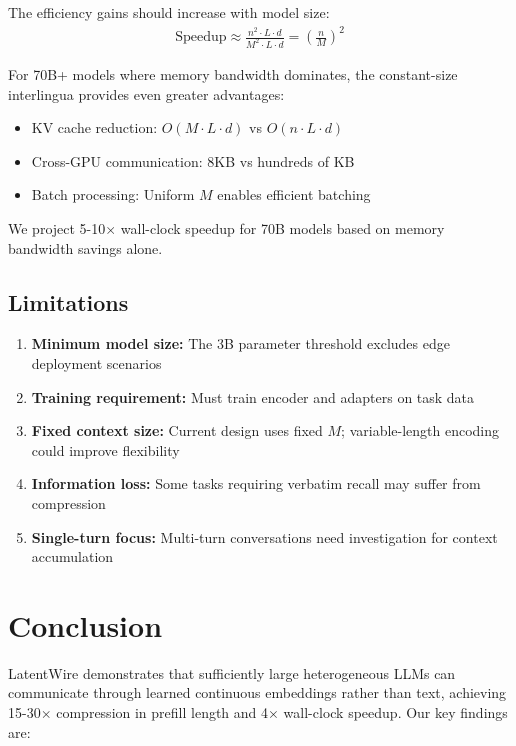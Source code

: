 \documentclass{article}
\begin{document}
The efficiency gains should increase with model size:
\begin{align}
\text{Speedup} \approx \frac{n^2 \cdot L \cdot d}{M^2 \cdot L \cdot d} = \left(\frac{n}{M}\right)^2
\end{align}

For 70B+ models where memory bandwidth dominates, the constant-size interlingua provides even greater advantages:
\begin{itemize}
\item KV cache reduction: $O(M \cdot L \cdot d)$ vs $O(n \cdot L \cdot d)$
\item Cross-GPU communication: 8KB vs hundreds of KB
\item Batch processing: Uniform $M$ enables efficient batching
\end{itemize}

We project 5-10$\times$ wall-clock speedup for 70B models based on memory bandwidth savings alone.

\subsection{Limitations}

\begin{enumerate}
\item \textbf{Minimum model size:} The 3B parameter threshold excludes edge deployment scenarios
\item \textbf{Training requirement:} Must train encoder and adapters on task data
\item \textbf{Fixed context size:} Current design uses fixed $M$; variable-length encoding could improve flexibility
\item \textbf{Information loss:} Some tasks requiring verbatim recall may suffer from compression
\item \textbf{Single-turn focus:} Multi-turn conversations need investigation for context accumulation
\end{enumerate}

\section{Conclusion}

LatentWire demonstrates that sufficiently large heterogeneous LLMs can communicate through learned continuous embeddings rather than text, achieving 15-30$\times$ compression in prefill length and 4$\times$ wall-clock speedup. Our key findings are: 
\end{document}
